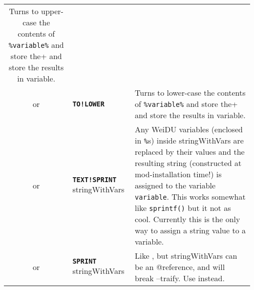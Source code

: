 \documentclass{article}
\def\ttref#1{\ahrefloc{#1}{\tt #1}}
\def\DEFINE#1{{\tt \bf #1}\label{#1}\index{#1}}
\def\t#1{{\tt #1}}
\begin{document}
\begin{tabular}{cp{10in}|p{10in}}
  Turns to upper-case the contents of \verb+%variable%+ and store the
  results in variable. \\
or & \DEFINE{TO!LOWER} \ttref{variable} &
  Turns to lower-case the contents of \verb+%variable%+ and store the
  results in variable. \\
or & \DEFINE{TEXT!SPRINT} \ttref{variable} stringWithVars &
  Any WeiDU variables (enclosed in \t{\%}s) inside stringWithVars are
  replaced by their values and the resulting string (constructed at
  mod-installation time!) is assigned to the variable \t{variable}.
  This works somewhat like \t{sprintf()} but it not as cool. Currently this
  is the only way to assign a string value to a variable. \\
or & \DEFINE{SPRINT} \ttref{variable} stringWithVars &
  Like \ttref{TEXT!SPRINT}, but stringWithVars can be an @reference, and will
  break --traify. Use \ttref{TEXT!SPRINT} instead. \\


\end{tabular}
\end{document}
